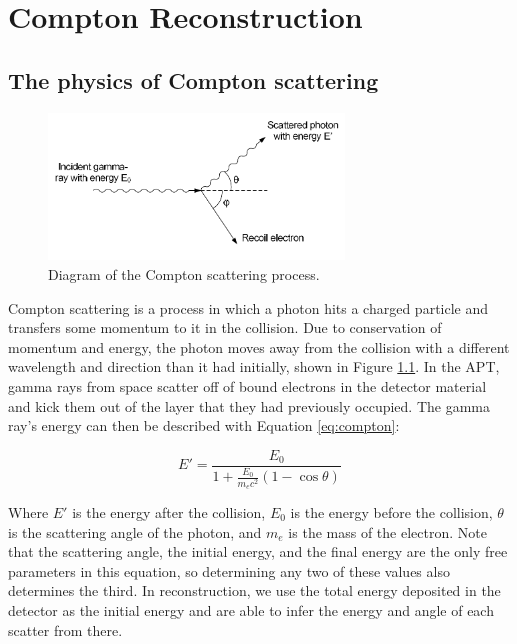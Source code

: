 %
\chapter{Compton Reconstruction}

\section{The physics of Compton scattering}

\begin{figure}
    \centering
    \includegraphics[width=0.7\textwidth]{Compton_scatter.png}
    \caption{Diagram of the Compton scattering process. \cite{comptonThesis}}
    \label{fig:compton_scatter}
\end{figure}

Compton scattering is a process in which a photon hits a charged particle and transfers some momentum to it in the collision. Due to conservation of momentum and energy, the photon moves away from the collision with a different wavelength and direction than it had initially, shown in Figure \ref{fig:compton_scatter}. In the APT, gamma rays from space scatter off of bound electrons in the detector material and kick them out of the layer that they had previously occupied. The gamma ray's energy can then be described with Equation \ref{eq:compton}:

\begin{equation}
    \label{eq:compton}E' = \frac{E_0}{1+\frac{E_0}{m_ec^2}(1-\cos\theta)}
\end{equation}

Where $E'$ is the energy after the collision, $E_0$ is the energy before the collision, $\theta$ is the scattering angle of the photon, and $m_e$ is the mass of the electron. Note that the scattering angle, the initial energy, and the final energy are the only free parameters in this equation, so determining any two of these values also determines the third. In reconstruction, we use the total energy deposited in the detector as the initial energy and are able to infer the energy and angle of each scatter from there.

